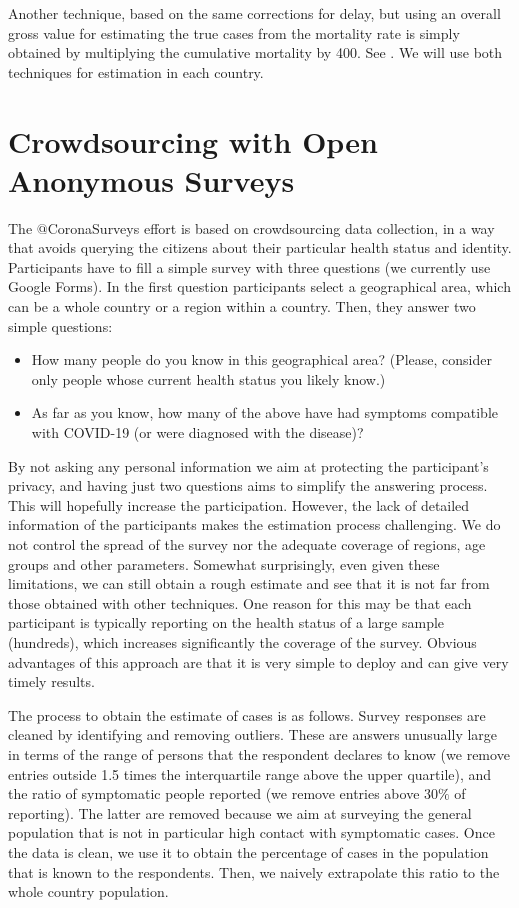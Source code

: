 \documentclass{article}
\begin{document}
Another technique, based on the same corrections for delay, but using an overall gross value for estimating the true cases from the mortality rate is simply obtained by multiplying the cumulative mortality by 400. See \cite{maxmen2020much}. We will use both techniques for estimation in each country.

\section{Crowdsourcing with Open Anonymous Surveys}

The $@$CoronaSurveys effort is based on crowdsourcing data collection, in a way that avoids querying the citizens about their particular health status and identity. Participants have to fill a simple survey with three questions (we currently use Google Forms). In the first question participants select a geographical area, which can be a whole country or a region within a country. Then, they answer two simple questions: 

\begin{itemize}
\item How many people do you know in this geographical area? (Please, consider only people whose current health status you likely know.)
\item As far as you know, how many of the above have had symptoms compatible with COVID-19 (or were diagnosed with the disease)?
\end{itemize}

By not asking any personal information we aim at protecting the participant's privacy, and having just two questions aims to simplify the answering process. This will hopefully increase the participation. However, the lack of detailed information of the participants makes the estimation process challenging. We do not control the spread of the survey nor the adequate coverage of regions, age groups and other parameters. Somewhat surprisingly, even given these limitations, we can still obtain a rough estimate and see that it is not far from those obtained with other techniques. One reason for this may be that each participant is typically reporting on the health status of a large sample (hundreds), which increases significantly the coverage of the survey. Obvious advantages of this approach are that it is very simple to deploy and can give very timely results.

The process to obtain the estimate of cases is as follows.
Survey responses are cleaned by identifying and removing outliers. These are answers unusually large in terms of the range of persons that the respondent declares to know (we remove entries outside 1.5 times the interquartile range above the upper quartile), and the ratio of symptomatic people reported (we remove entries above $30\%$ of reporting). The latter are removed because we aim at surveying the general population that is not in particular high contact with symptomatic cases. Once the data is clean, we use it to obtain the percentage of cases in the population that is known to the respondents. Then, we naively extrapolate this ratio to the whole country population.
\end{document}

